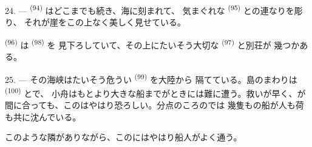 24. ---  \textsuperscript{(94)} はどこまでも続き、海に刻まれて、
気まぐれな \textsuperscript{(95)} との連なりを彫り、
それが崖をこの上なく美しく見せている。

 \textsuperscript{(96)} は \textsuperscript{(98)} を
見下ろしていて、その上にたいそう大切な \textsuperscript{(97)} と別荘が
幾つかある。

25. --- その海峡はたいそう危うい \textsuperscript{(99)} を大陸から
隔てている。島のまわりは \textsuperscript{(100)} とで、
小舟はもとより大きな船までがときには難に遭う。救いが早く、が
間に合っても、このはやはり恐ろしい。分点のころのでは
幾隻もの船が人も荷も共に沈んでいる。

このような隣がありながら、このにはやはり船人がよく通う。
\VUsaut{6.0mm}
\VUfilet{22mm}
